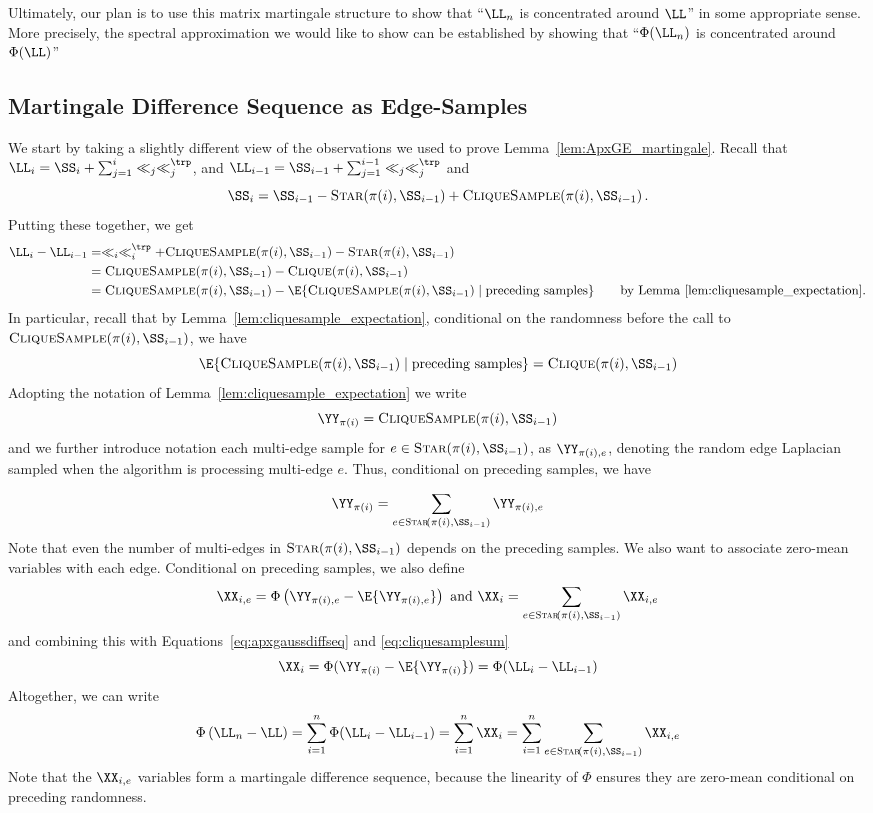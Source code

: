 Ultimately, our plan is to use this matrix martingale structure to show
that ``$\LL_n$ is concentrated around $\LL$'' in some appropriate
sense.
More precisely, the spectral approximation we would like to show can
be established by showing that  ``$\Phi(\LL_n)$ is concentrated around $\Phi(\LL)$''

\subsection{Martingale Difference Sequence as Edge-Samples}
We start by taking a slightly different view of the observations we
used to prove Lemma~\ref{lem:ApxGE_martingale}.
Recall that $\LL_i = \SS_i + \sum_{j=1}^i \ll_j\ll_j^\trp$,
and  $\LL_{i-1} = \SS_{i-1} + \sum_{j=1}^{i-1} \ll_j\ll_j^\trp$
and
\[
  \SS_{i} = \SS_{i-1} - \vstar{\pi(i)}{\SS_{i-1}} +
  \vcliqsp{\pi(i)}{\SS_{i-1}}
 . \]
Putting these together, we get
\begin{align}
  \LL_i - \LL_{i-1}
  &=
  \ll_i\ll_i^\trp
  +
  \vcliqsp{\pi(i)}{\SS_{i-1}}
  -
    \vstar{\pi(i)}{\SS_{i-1}}
     \nonumber
  \\
    \label{eq:apxgaussdiffseq}
  &=
  \vcliqsp{\pi(i)}{\SS_{i-1}}
  -
    \vcliq{\pi(i)}{\SS_{i-1}}
\\
  &=
  \vcliqsp{\pi(i)}{\SS_{i-1}}
  -
    \E{\vcliqsp{\pi(i)}{\SS_{i-1}} \mid \text{preceding samples}}
 \tag*{by Lemma~\ref{lem:cliquesample_expectation}.}
\end{align}
In particular, recall that by Lemma~\ref{lem:cliquesample_expectation},
conditional on the randomness before
the call to $\vcliqsp{\pi(i)}{\SS_{i-1}}$, we
have
\[
\E{\vcliqsp{\pi(i)}{\SS_{i-1}} \mid \text{preceding samples}}= \vcliq{\pi(i)}{\SS_{i-1}}
\]
Adopting the notation of Lemma~\ref{lem:cliquesample_expectation}
we write
\[
  \YY_{\pi(i)} = \vcliqsp{\pi(i)}{\SS_{i-1}}
\]
and we further introduce notation each multi-edge sample for
$e \in \vstar{\pi(i)}{\SS_{i-1}}$, as $\YY_{\pi(i),e}$, denoting the random
edge Laplacian sampled when the algorithm is processing multi-edge
$e$.
Thus, conditional on preceding samples, we have

\begin{equation}
  \label{eq:cliquesamplesum}
  \YY_{\pi(i)} = \sum_{e \in
    \vstar{\pi(i)}{\SS_{i-1}}}\YY_{\pi(i),e}
\end{equation}
Note that even the number of multi-edges in
$\vstar{\pi(i)}{\SS_{i-1}}$ depends on the preceding samples.
We also want to associate zero-mean variables with each edge.
Conditional on preceding samples, we also define
\[
  \XX_{i,e} = \Phi\left( \YY_{\pi(i),e} - \E{\YY_{\pi(i),e}} \right)
  \text{ and }
  \XX_{i} = \sum_{e \in
    \vstar{\pi(i)}{\SS_{i-1}}}\XX_{i,e}
\]
and combining this with Equations~\eqref{eq:apxgaussdiffseq} and \eqref{eq:cliquesamplesum}
\[
  \XX_{i}
  = \Phi(\YY_{\pi(i)} - \E{\YY_{\pi(i)}})
  = \Phi(\LL_i - \LL_{i-1})
\]
Altogether, we can write
\[
  \Phi\left(  \LL_n -\LL \right)
  =
    \sum_{i=1}^n \Phi(\LL_i - \LL_{i-1})
  =
  \sum_{i=1}^n \XX_i
  =
  \sum_{i=1}^n \sum_{e \in
    \vstar{\pi(i)}{\SS_{i-1}}}\XX_{i,e}
\]
Note that the $\XX_{i,e}$ variables form a martingale difference
sequence, because the linearity of $\Phi$ ensures they are zero-mean
conditional on preceding randomness.


